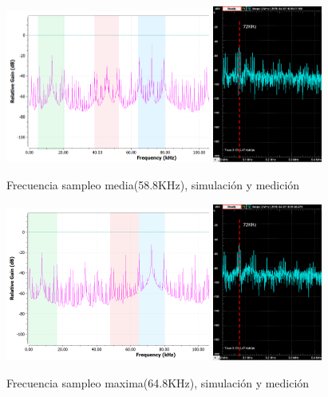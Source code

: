 \documentclass[../../ASSD_TP1_G7.tex]{subfiles}
\begin{document}
\begin{figure}[H]
\centering
{}
{\includegraphics[width=0.6\textwidth]{figures/simpto_8_llave_58,8_espectro.png}}
{\includegraphics[width=0.32\textwidth]{figures/pto_8_llave_58,8_espectro.png}}
\caption{Frecuencia sampleo media(58.8KHz), simulación y medición}
\label{fig:subnyq_lla_fmed}
\end{figure}

\begin{figure}[H]
\centering
{}
{\includegraphics[width=0.6\textwidth]{figures/simpto_8_llave_64,8khz_espectro.png}}
{\includegraphics[width=0.32\textwidth]{figures/pto_8_llave_64,8khz_espectro.png}}
\caption{Frecuencia sampleo maxima(64.8KHz), simulación y medición}
\label{fig:subnyq_lla_fmax}
\end{figure}
\end{document}
